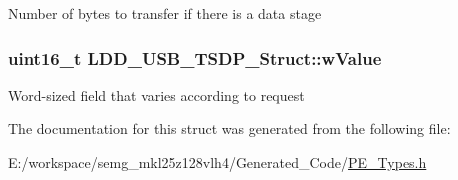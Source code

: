 Number of bytes to transfer if there is a data stage \hypertarget{struct_l_d_d___u_s_b___t_s_d_p___struct_abe97822a1a8976f53da5a43b8db8cfd3}{
\subsubsection[{w\-Value}]{\setlength{\rightskip}{0pt plus 5cm}uint16\-\_\-t L\-D\-D\-\_\-\-U\-S\-B\-\_\-\-T\-S\-D\-P\-\_\-\-Struct\-::w\-Value}}\label{struct_l_d_d___u_s_b___t_s_d_p___struct_abe97822a1a8976f53da5a43b8db8cfd3}
Word-\/sized field that varies according to request 

The documentation for this struct was generated from the following file\-:\begin{DoxyCompactItemize}
\item 
E\-:/workspace/semg\-\_\-mkl25z128vlh4/\-Generated\-\_\-\-Code/\hyperlink{_p_e___types_8h}{P\-E\-\_\-\-Types.\-h}\end{DoxyCompactItemize}

